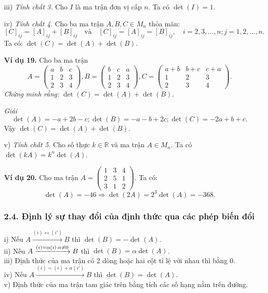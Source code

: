 iii) \textit{Tính chất 3.} Cho \(I\) là ma trận đơn vị cấp \(n\). Ta có \(\det(I) = 1\).

iv) \textit{Tính chất 4.} Cho ba ma trận \(A, B, C \in M_n\) thỏa mãn:
\[
[C]_{ij} = [A]_{ij} + [B]_{ij} \quad \text{và} \quad [C]_{ij} = [A]_{ij} = [B]_{ij}, \quad i = 2, 3, \ldots, n; j = 1, 2, \ldots, n.
\]
Ta có: \(\det(C) = \det(A) + \det(B)\).

\textbf{Ví dụ 19.} Cho ba ma trận
\[
A = \begin{pmatrix}
a & b & c \\
1 & 2 & 3 \\
2 & 3 & 4
\end{pmatrix},
B = \begin{pmatrix}
b & c & a \\
1 & 2 & 3 \\
2 & 3 & 4
\end{pmatrix},
C = \begin{pmatrix}
a + b & b + c & c + a \\
1 & 2 & 3 \\
2 & 3 & 4
\end{pmatrix}.
\]
\textit{Chứng minh rằng:} \(\det(C) = \det(A) + \det(B)\).

\textit{Giải}
\[
\det(A) = -a + 2b - c; \det(B) = -a - b + 2c; \det(C) = -2a + b + c.
\]
Vậy \(\det(C) = \det(A) + \det(B)\).

v) \textit{Tính chất 5.} Cho số thực \(k \in \mathbb{R}\) và ma trận \(A \in M_n\). Ta có \(\det(kA) = k^n \det(A)\).

\textbf{Ví dụ 20.} Cho ma trận \(A = \begin{pmatrix}
1 & 3 & 4 \\
2 & 5 & 1 \\
3 & 1 & 2
\end{pmatrix} \).
Ta có:
\[
\det(A) = -46 \Rightarrow \det(2A) = 2^3 \det(A) = -368.
\]

\subsubsection*{2.4. Định lý sự thay đổi của định thức qua các phép biến đổi}
i) Nếu \(A \xrightarrow{(i) \leftrightarrow (i')} B\) thì \(\det(B) = -\det(A)\).\\
ii) Nếu \(A \xrightarrow{(i)=\alpha(i) \\ \alpha \neq 0} B\) thì \(\det(B) = \alpha \det(A)\).\\
iii) Định thức của ma trận có 2 dòng hoặc hai cột tỉ lệ với nhau thì bằng 0.\\
iv) Nếu \(A \xrightarrow{(i)=(i)+\alpha(i')} B\) thì \(\det(B) = \det(A)\).\\
v) Định thức của ma trận tam giác trên bằng tích các số hạng nằm trên đường.

